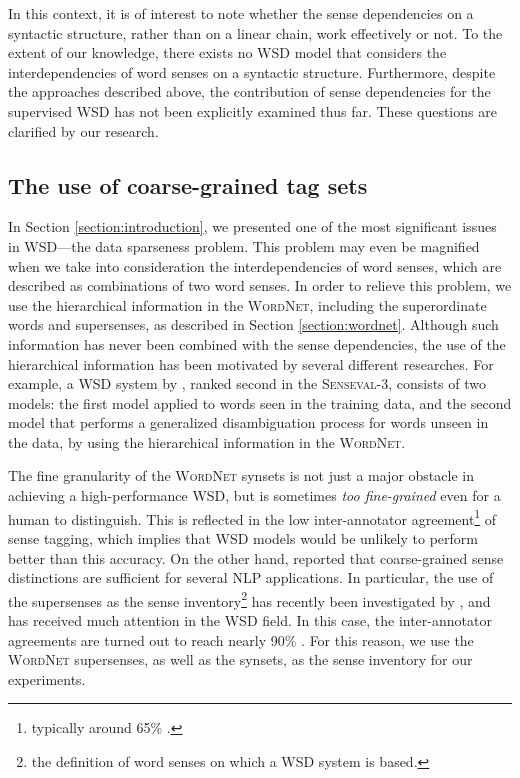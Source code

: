 \documentclass[english]{jnlp_1.4}
\begin{document}
In this context, it is of interest to note whether the sense dependencies on a syntactic structure, rather than on a linear chain, work effectively or not.
To the extent of our knowledge, there exists no WSD model that considers the interdependencies of word senses on a syntactic structure.
Furthermore, despite the approaches described above, the contribution of sense dependencies for the supervised WSD has not been explicitly examined thus far.
These questions are clarified by our research.


\subsection{The use of coarse-grained tag sets}

In Section \ref{section:introduction}, we presented one of the most significant issues in WSD---the data sparseness problem.
This problem may even be magnified when we take into consideration the interdependencies of word senses, which are described as combinations of two word senses.
In order to relieve this problem, we use the hierarchical information in the \textsc{WordNet}, including the superordinate words and supersenses, as described in Section \ref{section:wordnet}.
Although such information has never been combined with the sense dependencies, the use of the hierarchical information has been motivated by several different researches.
For example, a WSD system by \cite{mihalcea:2004}, ranked second in the \textsc{Senseval}-3, consists of two models: the first model applied to words seen in the training data, and the second model that performs a generalized disambiguation process for words unseen in the data, by using the hierarchical information in the \textsc{WordNet}.


The fine granularity of the \textsc{WordNet} synsets is not just a major obstacle in achieving a high-performance WSD, but is sometimes \textit{too fine-grained} even for a human to distinguish.
This is reflected in the low inter-annotator agreement\footnote{typically around 65\% \cite{mihalcea:2004:senseval3}.} of sense tagging, which implies that WSD models would be unlikely to perform better than this accuracy.
On the other hand, \cite{ide:1998} reported that coarse-grained sense distinctions are sufficient for several NLP applications.
In particular, the use of the supersenses as the sense inventory\footnote{the definition of word senses on which a WSD system is based.} has recently been investigated by \cite{ciaramita:2006}, and has received much attention in the WSD field.
In this case, the inter-annotator agreements are turned out to reach nearly 90\% \cite{navigli:2007}.
For this reason, we use the \textsc{WordNet} supersenses, as well as the synsets, as the sense inventory for our experiments.
\end{document}
